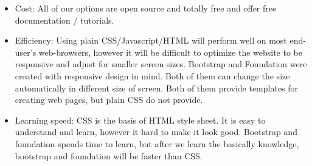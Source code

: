 \begin{itemize}
  \item {
    Cost:
    All of our options are open source and totally free and offer free documentation / tutorials.
  }
  \item {
    Efficiency:
    Using plain CSS/Javascript/HTML will perform well on most end-user's web-browsers, however it will be difficult to optimize the website to be responsive and adjust for smaller screen sizes.
    Bootstrap and Foundation were created with responsive design in mind.
    Both of them can change the size automatically in different size of screen.
    Both of them provide templates for creating web pages, but plain CSS do not provide.
  }
  \item {
    Learning speed:
    CSS is the basis of HTML style sheet.
    It is easy to understand and learn, however it hard to make it look good.
    Bootstrap and foundation spends time to learn, but after we learn the basically knowledge, bootstrap and foundation will be faster than CSS.
  }
\end{itemize}

